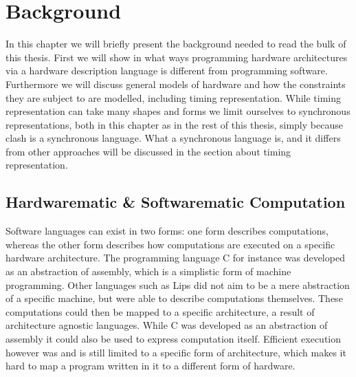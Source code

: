 
\chapter{Background}
In this chapter we will briefly present the background needed to read the bulk of this thesis.
First we will show in what ways programming hardware architectures via a hardware description language is different from programming software.
Furthermore we will discuss general models of hardware and how the constraints they are subject to are modelled, including timing representation. 
While timing representation can take many shapes and forms we limit ourselves to synchronous representations, both in this chapter as in the rest of this thesis, simply because \gls{clash} is a synchronous language.
What a synchronous language is, and it differs from other approaches will be discussed in the section about timing representation.

\section{Hardwarematic \& Softwarematic Computation}
Software languages can exist in two forms: one form describes computations, whereas the other form describes how computations are executed on a specific hardware architecture.
The programming language C for instance was developed as an abstraction of assembly, which is a simplistic form of machine programming.
Other languages such as Lips did not aim to be a mere abstraction of a specific machine, but were able to describe computations themselves. 
These computations could then be mapped to a specific architecture, a result of architecture agnostic languages. 
While C was developed as an abstraction of assembly it could also be used to express computation itself.
Efficient execution however was and is still limited to a specific form of architecture, which makes it hard to map a program written in it to a different form of hardware.

